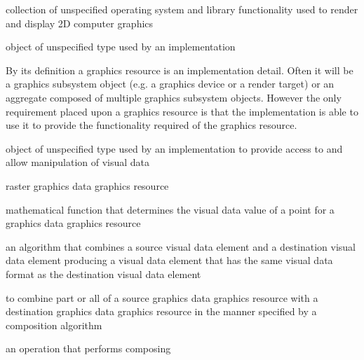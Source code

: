 
%
collection of unspecified operating system and library functionality used to render and display 2D computer graphics

%
 object of unspecified type used by an implementation
\begin{note}
By its definition a graphics resource is an implementation detail. Often it will be a graphics subsystem object (e.g. a graphics device or a render target) or an aggregate composed of multiple graphics subsystem objects. However the only requirement placed upon a graphics resource is that the implementation is able to use it to provide the functionality required of the graphics resource.
\end{note}

%
%
 object of unspecified type used by an implementation to provide access to and allow manipulation of visual data

\indexdefn{\pixmap}%
raster graphics data graphics resource

%
mathematical function that determines the visual data value of a point for a graphics data graphics resource

%
an algorithm that combines a source visual data element and a destination visual data element producing a visual data element that has the same visual data format as the destination visual data element

%
to combine part or all of a source graphics data graphics resource with a destination graphics data graphics resource in the manner specified by a composition algorithm

%
an operation that performs composing

